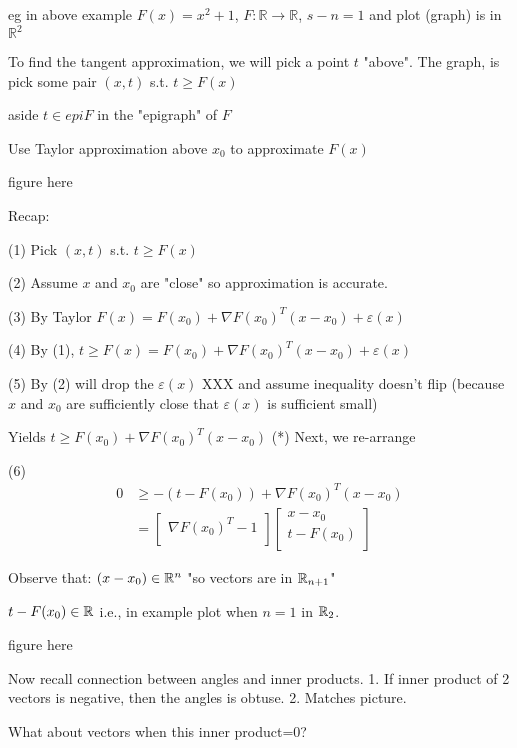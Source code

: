 eg in above example $F(x) = x^2+1$, $F \colon \mathbb{R} \to \mathbb{R}$, $s-n=1$ and plot (graph) is in $\mathbb{R}^2$

To find the tangent approximation, we will pick a point $t$ "above". The graph, is pick some pair $(x, t)$ s.t. $t \geq F(x)$

aside $t \in epi F$ in the "epigraph" of $F$

Use Taylor approximation above $x_0$ to approximate $F(x)$ 


figure here

Recap:

(1) Pick $(x, t)$ s.t. $t \geq F(x)$
 
(2) Assume $x$ and $x_0$ are "close" so approximation is accurate.

(3) By Taylor
$F(x) = F(x_0) + \nabla F(x_0)^{T} (x-x_0) + \varepsilon(x)$

(4) By (1), $t \geq F(x) = F(x_0) + \nabla F(x_0)^{T} (x-x_0) + \varepsilon(x)$

(5) By (2) will drop the $\varepsilon(x)$ XXX and assume inequality doesn't flip (because $x$ and $x_0$ are sufficiently close that $\varepsilon(x)$ is sufficient small)

Yields $t \geq F(x_0) + \nabla F(x_0)^{T} (x-x_0)$  (*)
Next, we re-arrange

(6)
\begin{align*}
0 &\geq -(t-F(x_0)) + \nabla F(x_0)^{T} (x - x_0) \\
&=\begin{bmatrix} \nabla F(x_0)^{T} -1\\ \end{bmatrix}  \begin{bmatrix} x-x_0\\ t-F(x_0)\\ \end{bmatrix} 
\end{align*}


Observe that:
$(x-x_{0})\in \mathbb{R}^{n}$ "so vectors are in $\mathbb{R}_{n+1}$"

$t-F(x_{0})\in\mathbb{R}$ i.e., in example plot when $n=1$ in $\mathbb{R}_{2}$.

figure here


Now recall connection between angles and inner products.
1. If inner product of 2 vectors is negative, then the angles is obtuse.
2. Matches picture.

What about vectors when this inner product=0?



